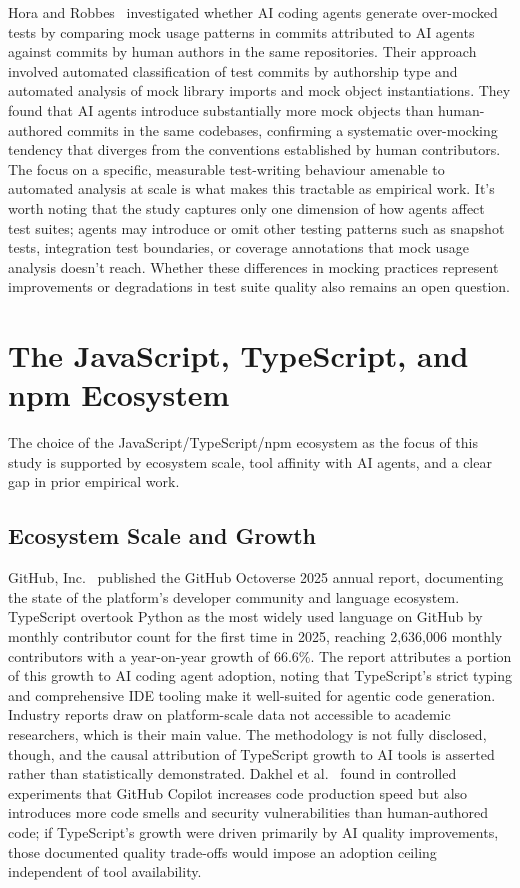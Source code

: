 Hora and Robbes~\cite{horaRobbes2026} investigated whether AI coding agents generate
over-mocked tests by comparing mock usage patterns in commits attributed to AI agents
against commits by human authors in the same repositories. Their approach involved
automated classification of test commits by authorship type and automated analysis of
mock library imports and mock object instantiations. They found that AI agents
introduce substantially more mock objects than human-authored commits in the same
codebases, confirming a systematic over-mocking tendency that diverges from the
conventions established by human contributors. The focus on a specific, measurable
test-writing behaviour amenable to automated analysis at scale is what makes this
tractable as empirical work. It's worth noting that the study captures only one
dimension of how agents affect test suites; agents may introduce or omit other
testing patterns such as snapshot tests, integration test boundaries, or coverage
annotations that mock usage analysis doesn't reach. Whether these differences in
mocking practices represent improvements or degradations in test suite quality also
remains an open question.

\section{The JavaScript, TypeScript, and npm Ecosystem}
\label{sec:lr:ecosystem}

The choice of the JavaScript/TypeScript/npm ecosystem as the focus of this
study is supported by ecosystem scale, tool affinity with AI agents, and a
clear gap in prior empirical work.

\subsection{Ecosystem Scale and Growth}

GitHub, Inc.~\cite{octoverse2025} published the GitHub Octoverse 2025 annual
report, documenting the state of the platform's developer community and language
ecosystem. TypeScript overtook Python as the most widely used language on GitHub
by monthly contributor count for the first time in 2025, reaching 2,636,006 monthly
contributors with a year-on-year growth of 66.6\%. The report attributes a portion
of this growth to AI coding agent adoption, noting that TypeScript's strict typing
and comprehensive IDE tooling make it well-suited for agentic code generation.
Industry reports draw on platform-scale data not accessible to academic researchers,
which is their main value. The methodology is not fully disclosed, though, and the
causal attribution of TypeScript growth to AI tools is asserted rather than
statistically demonstrated. Dakhel et al.~\cite{dakhel2023} found in controlled
experiments that GitHub Copilot increases code production speed but also introduces
more code smells and security vulnerabilities than human-authored code; if
TypeScript's growth were driven primarily by AI quality improvements, those
documented quality trade-offs would impose an adoption ceiling independent of tool
availability.

